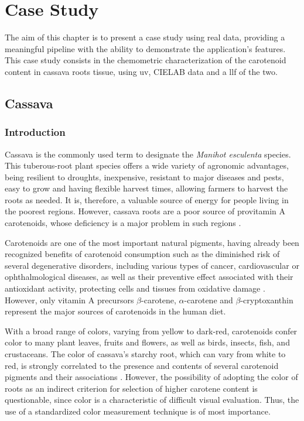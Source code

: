 
\chapter{Case Study} \label{case_study}

The aim of this chapter is to present a case study using real data, providing a meaningful pipeline with the ability to demonstrate the application's features. This case study consists in the chemometric characterization of the carotenoid content in cassava roots tissue, using \gls{uv}, CIELAB data and a \acrlong{llf} of the two.


\section{Cassava}

\subsection{Introduction}

Cassava is the commonly used term to designate the \textit{Manihot esculenta} species. This tuberous-root plant species offers a wide variety of agronomic advantages, being resilient to droughts, inexpensive, resistant to major diseases and pests, easy to grow and having flexible harvest times, allowing farmers to harvest the roots as needed. It is, therefore, a valuable source of energy for people living in the poorest regions. However, cassava roots are a poor source of provitamin A carotenoids, whose deficiency is a major problem in such regions \citep{la2013biofortified, sanchez2014prediction}. 

Carotenoids are one of the most important natural pigments, having already been recognized benefits of carotenoid consumption such as the diminished risk of several degenerative disorders, including various types of cancer, cardiovascular or ophthalmological diseases, as well as their preventive effect associated with their antioxidant activity, protecting cells and tissues from oxidative damage \citep{stahl2003antioxidant}. However, only vitamin A precursors $\beta$-carotene, $\alpha$-carotene and $\beta$-cryptoxanthin represent the major sources of carotenoids in the human diet.

With a broad range of colors, varying from yellow to dark-red, carotenoids confer color to many plant leaves, fruits and flowers, as well as birds, insects, fish, and crustaceans. The color of cassava's starchy root, which can vary from white to red, is strongly correlated to the presence and contents of several carotenoid pigments and their associations \citep{sanchez2006reduction}. However, the possibility of adopting the color of roots as an indirect criterion for selection of higher carotene content is questionable, since color is a characteristic of difficult visual evaluation. Thus, the use of a standardized color measurement technique is of most importance.

